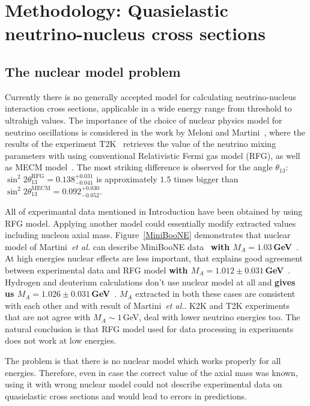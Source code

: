 \section{Methodology: Quasielastic neutrino-nucleus cross sections}
\subsection{The nuclear model problem}
Currently there is no generally accepted model for calculating neutrino-nucleus interaction cross sections, applicable in a wide energy range from threshold to ultrahigh values. The importance of the choice of nuclear physics model for neutrino oscillations is considered in the work by Meloni and Martini~\cite{Meloni:2012fq}, where the results of the experiment T2K~\cite{Abe:2011sj,Abe:2012gx} retrieves the value of the neutrino mixing parameters with using conventional Relativistic Fermi gas model (RFG), as well as MECM model~\cite{Martini:2009uj}. The most striking difference is observed for the angle $\theta_{13}$: $\sin^{2}2\theta_{13}^{\textrm{RFG}}=0.138^{+0.031}_{-0.041}$ is approximately $1.5$ times bigger than $\sin^{2}2\theta_{13}^{\textrm{MECM}}=0.092^{+0.030}_{-0.052}$.

All of experimantal data mentioned in Introduction have been obtained by using RFG model. Applying another model could essentially modify extracted values including nucleon axial mass. Figure~\ref{MiniBooNE} demonstrates that nuclear model of Martini~\textit{et al.} can describe MiniBooNE data~\cite{AguilarArevalo:2010zc} \textbf{with $M_{A}=1.03$\,GeV}~\cite{Martini:2011wp}. At high energies nuclear effects are less important, that explains good agreement between experimental data and RFG model \textbf{with $M_{A}=1.012\pm{0.031}$\,GeV}~\cite{Kuzmin:2014}. Hydrogen and deuterium calculations don't use nuclear model at all and \textbf{gives us $M_{A}=1.026\pm{0.031}$\,GeV}~\cite{Kuzmin:2014}. $M_{A}$ extracted in both these cases are consistent with each other and with result of Martini~\textit{et al.}. K2K and T2K experiments that are not agree with $M_{A}\sim1$\,GeV, deal with lower neutrino energies too. The natural conclusion is that RFG model used for data processing in experiments does not work at low energies.

The problem is that there is no nuclear model which works properly for all energies. Therefore, even in case the correct value of the axial mass was known, using it with wrong nuclear model could not describe experimental data on quasielastic cross sections and would lead to errors in predictions.

